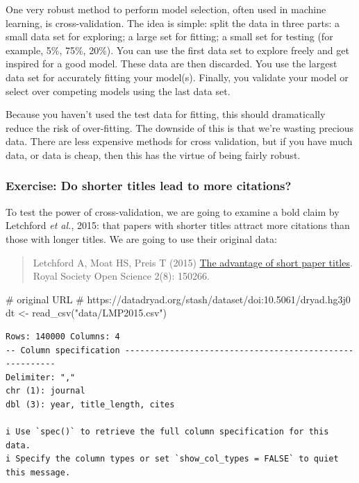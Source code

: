 \documentclass[
  letterpaper,
  DIV=11,
  numbers=noendperiod]{scrreprt}
\newenvironment{Shaded}{\begin{snugshade}}{\end{snugshade}}
\newcommand{\CommentTok}[1]{\textcolor[rgb]{0.37,0.37,0.37}{#1}}
\newcommand{\FunctionTok}[1]{\textcolor[rgb]{0.28,0.35,0.67}{#1}}
\newcommand{\NormalTok}[1]{\textcolor[rgb]{0.00,0.23,0.31}{#1}}
\newcommand{\OtherTok}[1]{\textcolor[rgb]{0.00,0.23,0.31}{#1}}
\newcommand{\StringTok}[1]{\textcolor[rgb]{0.13,0.47,0.30}{#1}}
\begin{document}
One very robust method to perform model selection, often used in machine
learning, is cross-validation. The idea is simple: split the data in
three parts: a small data set for exploring; a large set for fitting; a
small set for testing (for example, 5\%, 75\%, 20\%). You can use the
first data set to explore freely and get inspired for a good model.
These data are then discarded. You use the largest data set for
accurately fitting your model(s). Finally, you validate your model or
select over competing models using the last data set.

Because you haven't used the test data for fitting, this should
dramatically reduce the risk of over-fitting. The downside of this is
that we're wasting precious data. There are less expensive methods for
cross validation, but if you have much data, or data is cheap, then this
has the virtue of being fairly robust.

\hypertarget{exercise-do-shorter-titles-lead-to-more-citations}{%
\subsubsection{Exercise: Do shorter titles lead to more
citations?}\label{exercise-do-shorter-titles-lead-to-more-citations}}

To test the power of cross-validation, we are going to examine a bold
claim by Letchford \emph{et al.}, 2015: that papers with shorter titles
attract more citations than those with longer titles. We are going to
use their original data:

\begin{quote}
Letchford A, Moat HS, Preis T (2015)
\href{https://doi.org/10.1098/rsos.150266}{The advantage of short paper
titles}. Royal Society Open Science 2(8): 150266.
\end{quote}

\begin{Shaded}
\begin{Highlighting}[]
\CommentTok{\# original URL}
\CommentTok{\# https://datadryad.org/stash/dataset/doi:10.5061/dryad.hg3j0}
\NormalTok{dt }\OtherTok{\textless{}{-}} \FunctionTok{read\_csv}\NormalTok{(}\StringTok{"data/LMP2015.csv"}\NormalTok{)}
\end{Highlighting}
\end{Shaded}

\begin{verbatim}
Rows: 140000 Columns: 4
-- Column specification --------------------------------------------------------
Delimiter: ","
chr (1): journal
dbl (3): year, title_length, cites

i Use `spec()` to retrieve the full column specification for this data.
i Specify the column types or set `show_col_types = FALSE` to quiet this message.
\end{verbatim}
\end{document}
